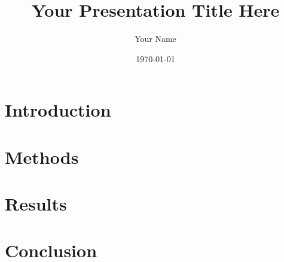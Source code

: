 \documentclass[10pt]{beamer}
\title{Your Presentation Title Here}
\author{Your Name}
\institute{Stevens Institute of Technology}
\date{\today}
\newcommand{\secnameI}{Introduction}
\newcommand{\secnameII}{Methods}
\newcommand{\secnameIII}{Results}
\newcommand{\secnameIV}{Conclusion}
\begin{document}
\begin{frame}[plain]
\titlepage
\end{frame}

\section{\secnameI}


\section{\secnameII}


\section{\secnameIII}


\section{\secnameIV}


\end{document}
